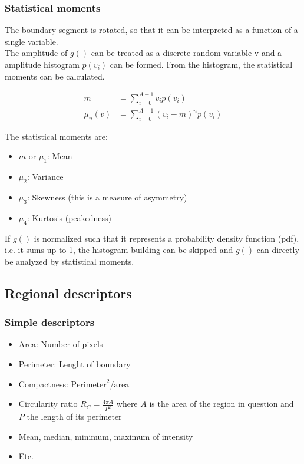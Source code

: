 \subsubsection{Statistical moments}
The boundary segment is rotated, so that it can be interpreted as a function of a single variable. \\

The amplitude of $g()$ can be treated as a discrete random variable v and a amplitude histogram $p(v_i)$ can be formed. 
From the histogram, the statistical moments can be calculated.

\begin{align*}
	m &= \sum\limits_{i=0}^{A-1} v_i p(v_i) \\
	\mu_n(v) &= \sum\limits_{i=0}^{A-1} (v_i-m)^n p(v_i)
\end{align*}

The statistical moments are:
\begin{itemize}
\item $m$ or $\mu_1$: Mean
\item $\mu_2$: Variance
\item $\mu_3$: Skewness (this is a measure of asymmetry)
\item $\mu_4$: Kurtosis (peakedness)
\end{itemize}

If $g()$ is normalized such that it represents a probability density function (pdf), i.e. it sums up to 1, 
the histogram building can be skipped and $g()$ can directly be analyzed by statistical moments.

\subsection{Regional descriptors}
\subsubsection{Simple descriptors}
\begin{itemize}
\item Area: Number of pixels
\item Perimeter: Lenght of boundary
\item Compactness: $\text{Perimeter}^2/\text{area}$
\item Circularity ratio $R_C=\frac{4\pi A}{P^2}$ where $A$ is the area of the region in question and $P$ the length of its perimeter
\item Mean, median, minimum, maximum of intensity
\item Etc.
\end{itemize}
